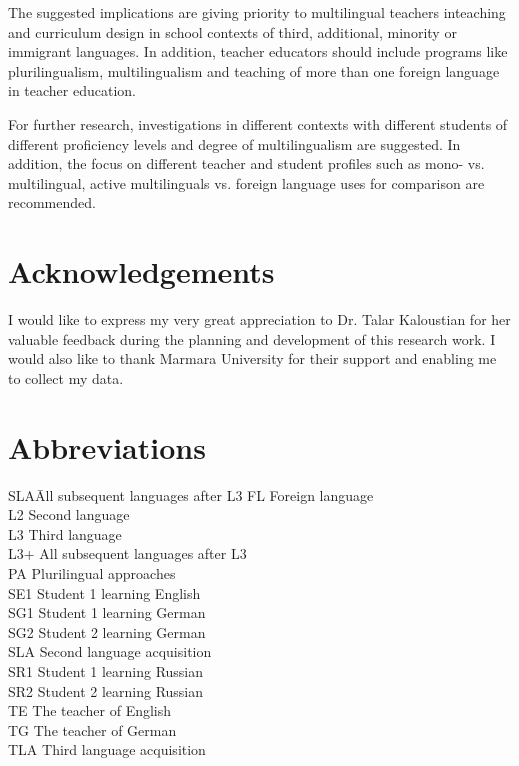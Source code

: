 \documentclass[output=paper]{../langscibook}
\begin{document}
The suggested implications are giving priority to multilingual teachers in\linebreak teaching and curriculum design in school contexts of third, additional, minority or immigrant languages. In addition, teacher educators should include programs like plurilingualism, multilingualism and teaching of more than one foreign language in teacher education.

For further research, investigations in different contexts with different students of different proficiency levels and degree of multilingualism are suggested. In addition, the focus on different teacher and student profiles such as mono- vs. multilingual, active multilinguals vs. foreign language uses for comparison are recommended.

\section*{Acknowledgements}

I would like to express my very great appreciation to Dr. Talar Kaloustian for her valuable feedback during the planning and development of this research work. I would also like to thank Marmara University for their support and enabling me to collect my data.

\section*{Abbreviations}
\begin{multicols}{2}
\begin{tabbing}
SLA\quad \=  All subsequent languages after L3\kill
FL  \>  Foreign language\\
L2  \>  Second language\\
L3  \>  Third language\\
L3+ \>  All subsequent languages after L3\\
PA  \>  Plurilingual approaches\\
SE1 \>  Student 1 learning English\\
SG1 \>  Student 1 learning German\\
SG2 \>  Student 2 learning German\\
SLA \>  Second language acquisition\\
SR1 \>  Student 1 learning Russian\\
SR2 \>  Student 2 learning Russian\\
TE  \>  The teacher of English\\
TG  \>  The teacher of German\\
TLA \>  Third language acquisition
\end{tabbing}
\end{multicols}
\end{document}
